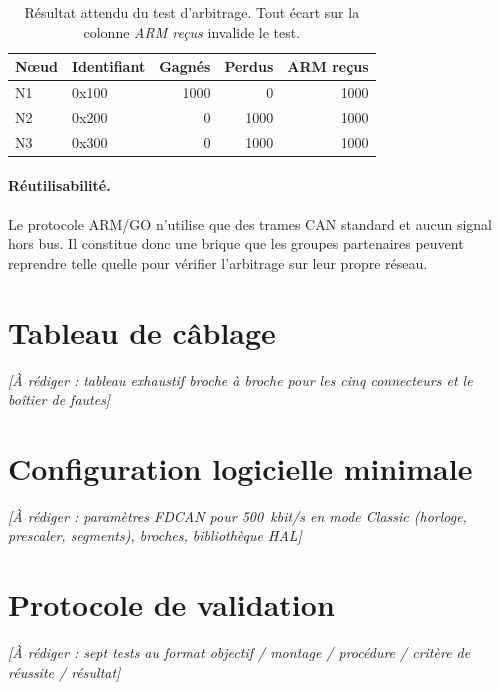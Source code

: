 \documentclass[11pt,a4paper]{article}
\newcommand{\todo}[1]{\textcolor{todo}{\textit{[À rédiger : #1]}}}
\begin{document}
\begin{table}[H]
\centering\small
\begin{tabular}{llrrr}
\toprule
\textbf{Nœud} & \textbf{Identifiant} & \textbf{Gagnés} & \textbf{Perdus} & \textbf{ARM reçus} \\
\midrule
N1 & 0x100 & \num{1000} & \num{0} & \num{1000} \\
N2 & 0x200 & \num{0} & \num{1000} & \num{1000} \\
N3 & 0x300 & \num{0} & \num{1000} & \num{1000} \\
\bottomrule
\end{tabular}
\caption{Résultat attendu du test d'arbitrage. Tout écart sur la colonne \emph{ARM reçus}
invalide le test.}
\end{table}

\paragraph{Réutilisabilité.} Le protocole ARM/GO n'utilise que des trames CAN standard et
aucun signal hors bus. Il constitue donc une brique que les groupes partenaires peuvent
reprendre telle quelle pour vérifier l'arbitrage sur leur propre réseau.

\section{Tableau de câblage}
\todo{tableau exhaustif broche à broche pour les cinq connecteurs et le boîtier de fautes}

\section{Configuration logicielle minimale}
\todo{paramètres FDCAN pour \SI{500}{kbit/s} en mode Classic (horloge, prescaler, segments), broches, bibliothèque HAL}

\section{Protocole de validation}
\label{sec:protocole}
\todo{sept tests au format objectif / montage / procédure / critère de réussite / résultat}
\end{document}
